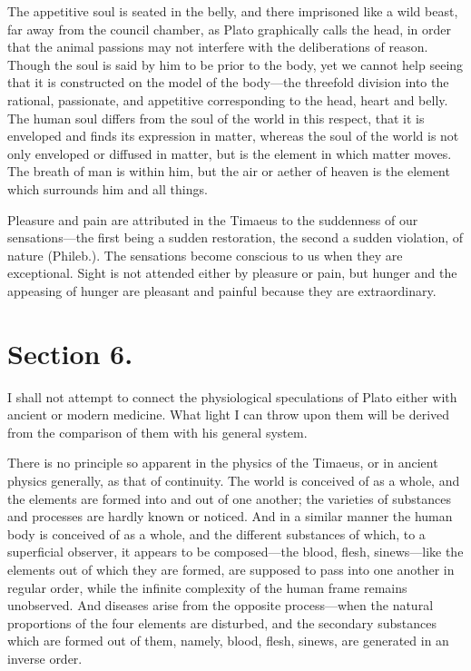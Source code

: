 \documentclass[11pt,letter]{article}
\begin{document}
\par  The appetitive soul is seated in the belly, and there imprisoned like a wild beast, far away from the council chamber, as Plato graphically calls the head, in order that the animal passions may not interfere with the deliberations of reason. Though the soul is said by him to be prior to the body, yet we cannot help seeing that it is constructed on the model of the body—the threefold division into the rational, passionate, and appetitive corresponding to the head, heart and belly. The human soul differs from the soul of the world in this respect, that it is enveloped and finds its expression in matter, whereas the soul of the world is not only enveloped or diffused in matter, but is the element in which matter moves. The breath of man is within him, but the air or aether of heaven is the element which surrounds him and all things.

\par  Pleasure and pain are attributed in the Timaeus to the suddenness of our sensations—the first being a sudden restoration, the second a sudden violation, of nature (Phileb.). The sensations become conscious to us when they are exceptional. Sight is not attended either by pleasure or pain, but hunger and the appeasing of hunger are pleasant and painful because they are extraordinary.

\par 
\section{
      Section 6.
    }
\par  I shall not attempt to connect the physiological speculations of Plato either with ancient or modern medicine. What light I can throw upon them will be derived from the comparison of them with his general system.

\par  There is no principle so apparent in the physics of the Timaeus, or in ancient physics generally, as that of continuity. The world is conceived of as a whole, and the elements are formed into and out of one another; the varieties of substances and processes are hardly known or noticed. And in a similar manner the human body is conceived of as a whole, and the different substances of which, to a superficial observer, it appears to be composed—the blood, flesh, sinews—like the elements out of which they are formed, are supposed to pass into one another in regular order, while the infinite complexity of the human frame remains unobserved. And diseases arise from the opposite process—when the natural proportions of the four elements are disturbed, and the secondary substances which are formed out of them, namely, blood, flesh, sinews, are generated in an inverse order.
\end{document}
